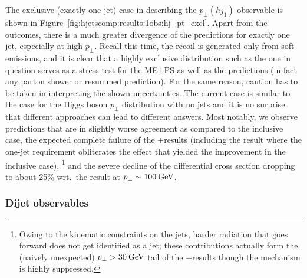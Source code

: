 The exclusive (exactly one jet) case in describing the $p_\perp(hj_1)$
observable is shown in Figure~\ref{fig:hjetscomp:results:1obs:hj_pt_excl}.
Apart from the \NNLOPS outcomes, there is a much greater divergence of
the predictions for exactly one jet, especially at high $p_\perp$.
Recall this time, the recoil is generated only from soft emissions, and
it is clear that a highly exclusive distribution such as the one in
question serves as a stress test for the ME+PS as well as the \NNLOPS
predictions (in fact any parton shower or resummed prediction). For
the same reason, caution has to be taken in interpreting the shown
uncertainties. The current case is similar to the case for the Higgs
boson $p_\perp$ distribution with no jets and it is no surprise that
different approaches can lead to different answers. Most notably, we
observe \NNLOPS predictions that are in slightly worse agreement as
compared to the inclusive case, the expected complete failure of the
\GoSam{}+\Sherpa results (including the \Loopsim result where the
one-jet requirement obliterates the effect that yielded the
improvement in the inclusive case),%
\footnote{Owing to the kinematic constraints on the jets, harder
  radiation that goes forward does not get identified as a jet;
  these contributions actually form the (naively unexpected)
  $p_\perp>30\text{\:GeV}$ tail of the \GoSam{}+\Sherpa results though the mechanism is
  highly suppressed.}
and the severe decline of the \Herwig differential cross section
dropping to about 25\% wrt.~the \Powheg result at $p_\perp\sim100\text{\:GeV}$.



\subsubsection{Dijet observables}
\label{sec:hjetscomp:results:2jobs}


